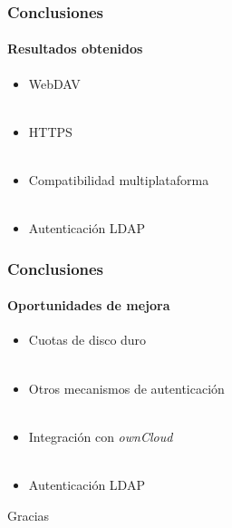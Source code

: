 \documentclass{beamer}
\begin{document}

\begin{frame}
\frametitle{Conclusiones}
\framesubtitle{Resultados obtenidos}
\justifying
\begin{itemize}
 \item \textup{WebDAV}
\\~\\
 \item \textup{HTTPS}
\\~\\
 \item Compatibilidad multiplataforma
\\~\\
 \item Autenticaci\'{o}n \textup{LDAP}
\end{itemize}
\end{frame}


\begin{frame}
\frametitle{Conclusiones}
\framesubtitle{Oportunidades de mejora}
\justifying
\begin{itemize}
 \item Cuotas de disco duro
\\~\\
 \item Otros mecanismos de autenticaci\'{o}n
\\~\\
 \item Integraci\'{o}n con \textsl{ownCloud}
\\~\\
 \item Autenticaci\'{o}n \textup{LDAP}
\end{itemize}
\end{frame}


\begin{frame}
\Huge{\centerline{Gracias}}
\end{frame}

\end{document}
